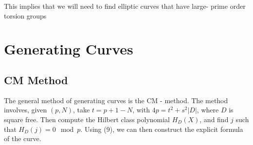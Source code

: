 \documentclass[12pt,twoside]{article}
\begin{document}
This implies that we will need to find elliptic curves that have large- prime order torsion groups




\section{Generating Curves} 

\subsection{CM Method} 
The general method of generating curves is the CM - method. 
The method involves, given $(p, N)$,  take $t = p+1 - N$, with $4p = t^{2} + s^{2}|D|$, where $D$ is square free. Then compute the Hilbert class polynomial $H_{D}(X)$, and find $j$ such that $H_{D}(j) = 0 \mod p$. Using (9), we can then construct the explicit formula of the curve.   













\end{document}
